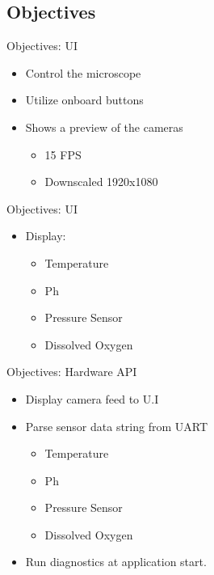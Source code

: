 \documentclass[14pt, aspectratio=169]{beamer}
\begin{document}
\subsection{Objectives}
\begin{frame}{Objectives: UI}
	\begin{itemize}
		\item Control the microscope
		\item Utilize onboard buttons
		\item Shows a preview of the cameras
		      \begin{itemize}
			      \item 15 FPS
			      \item Downscaled 1920x1080
		      \end{itemize}
	\end{itemize}
\end{frame}
\begin{frame}{Objectives: UI}
	\begin{itemize}
		\item Display:
		      \begin{itemize}
			      \item Temperature
			      \item Ph
			      \item Pressure Sensor
			      \item Dissolved Oxygen
		      \end{itemize}
	\end{itemize}
\end{frame}
\begin{frame}{Objectives: Hardware API}
	\begin{itemize}
		\item Display camera feed to U.I
		\item Parse sensor data string from UART
		      \begin{itemize}
			      \item Temperature
			      \item Ph
			      \item Pressure Sensor
			      \item Dissolved Oxygen
		      \end{itemize}
		\item Run diagnostics at application start.
	\end{itemize}
\end{frame}
\end{document}
